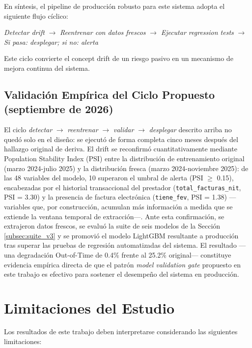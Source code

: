 \documentclass[12pt,letterpaper]{report}
\begin{document}
En síntesis, el pipeline de producción robusto para este sistema adopta el siguiente flujo cíclico:

\begin{center}
\textit{Detectar drift} $\rightarrow$ \textit{Reentrenar con datos frescos} $\rightarrow$ \textit{Ejecutar regression tests} $\rightarrow$ \textit{Si pasa: desplegar; si no: alerta}
\end{center}

Este ciclo convierte el concept drift de un riesgo pasivo en un mecanismo de mejora continua del sistema.

\subsection{Validación Empírica del Ciclo Propuesto (septiembre de 2026)}
El ciclo \textit{detectar} $\rightarrow$ \textit{reentrenar} $\rightarrow$ \textit{validar} $\rightarrow$ \textit{desplegar} descrito arriba no quedó solo en el diseño: se ejecutó de forma completa cinco meses después del hallazgo original de deriva. El drift se reconfirmó cuantitativamente mediante Population Stability Index (PSI) entre la distribución de entrenamiento original (marzo 2024-julio 2025) y la distribución fresca (marzo 2024-noviembre 2025): de las 48 variables del modelo, 10 superaron el umbral de alerta (PSI $\geq$ 0.15), encabezadas por el historial transaccional del prestador (\texttt{total\_facturas\_nit}, PSI = 3.30) y la presencia de factura electrónica (\texttt{tiene\_fev}, PSI = 1.38) —variables que, por construcción, acumulan más información a medida que se extiende la ventana temporal de extracción—. Ante esta confirmación, se extrajeron datos frescos, se evaluó la suite de seis modelos de la Sección \ref{subsec:suite_v3} y se promovió el modelo LightGBM resultante a producción tras superar las pruebas de regresión automatizadas del sistema. El resultado —una degradación Out-of-Time de 0.4\% frente al 25.2\% original— constituye evidencia empírica directa de que el patrón \textit{model validation gate} propuesto en este trabajo es efectivo para sostener el desempeño del sistema en producción.

\section{Limitaciones del Estudio}

Los resultados de este trabajo deben interpretarse considerando las siguientes limitaciones:
\end{document}

